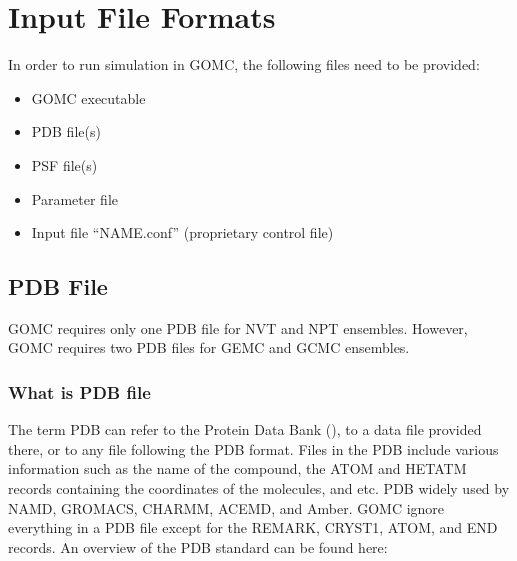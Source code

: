 \documentclass[letterpaper,10pt,english]{sphinxmanual}
\begin{document}
\chapter{Input File Formats}
\label{\detokenize{input_file:input-file-formats}}\label{\detokenize{input_file::doc}}
In order to run simulation in GOMC, the following files need to be provided:
\begin{itemize}
\item {} 
GOMC executable

\item {} 
PDB file(s)

\item {} 
PSF file(s)

\item {} 
Parameter file

\item {} 
Input file “NAME.conf” (proprietary control file)

\end{itemize}


\section{PDB File}
\label{\detokenize{input_file:pdb-file}}
GOMC requires only one PDB file for NVT and NPT ensembles. However, GOMC requires two PDB files for GEMC and GCMC ensembles.


\subsection{What is PDB file}
\label{\detokenize{input_file:what-is-pdb-file}}
The term PDB can refer to the Protein Data Bank (), to a data file provided there, or to any file following the PDB format.
Files in the PDB include various information such as the name of the compound, the ATOM and HETATM records containing the coordinates of the molecules, and etc.
PDB widely used by NAMD, GROMACS, CHARMM, ACEMD, and Amber. GOMC ignore everything in a PDB file except for the REMARK, CRYST1, ATOM, and END records.
An overview of the PDB standard can be found here:



\end{document}
